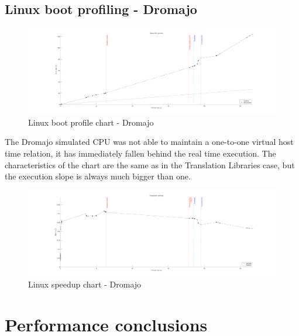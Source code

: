 \pagebreak

\subsection*{Linux boot profiling - Dromajo}

\begin{figure}[h]
	\centering
    \hspace*{-2cm}
	\includegraphics[width=1.2\textwidth]{figures/benchmarks/linux_boot/adnotated/DromajoBoot.pdf}
	\caption{Linux boot profile chart - Dromajo}
\end{figure}

\noindent
The Dromajo simulated CPU was not able to maintain a one-to-one virtual host time relation, it has immediately fallen
behind the real time execution. The characteristics of the chart are the same as in the Translation Libraries case, but the
execution slope is always much bigger than one.

\begin{figure}[h]
	\centering
    \hspace*{-2cm}
	\includegraphics[width=1.2\textwidth]{figures/benchmarks/linux_boot/adnotated/DromajoSpeedup.pdf}
	\caption{Linux speedup chart - Dromajo}
\end{figure}

\pagebreak

\section{Performance conclusions}

